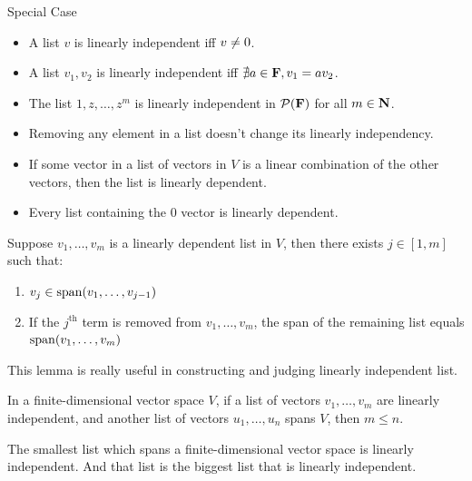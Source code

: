 \documentclass[12pt,a4paper]{article}
\begin{document}
    \begin{eg}
        Special Case
        
        \begin{itemize}
            \item A list $v$ is linearly independent iff $v\not=0$.
            \item A list $v_1,v_2$ is linearly independent iff $\nexists a\in\mathbf{F},v_1=av_2$.
            \item The list $1,z,\dots,z^m$ is linearly independent in $\mathcal{P}(\mathbf{F})$ for all $m\in\mathbf{N}$.
            \item Removing any element in a list doesn't change its linearly independency.\\

            \item If some vector in a list of vectors in $V$ is a linear combination of the other vectors, then the list is linearly dependent.
            \item Every list containing the $0$ vector is linearly dependent.
        \end{itemize}
    \end{eg}
    \hfill
    
    \begin{lemma}\label{2.10}
    Suppose $v_1,\dots,v_m$ is a linearly dependent list in $V$, then there exists $j\in[1,m]$ such that:
    \begin{enumerate}
        \item $v_j\in\operatorname{span}(v_1,\dots,v_{j-1})$
        \item If the $j^\text{th}$ term is removed from $v_1,\dots,v_m$, the span of the remaining list equals $\operatorname{span}(v_1,\dots,v_m)$
    \end{enumerate}
    \end{lemma}
    \begin{remark}
        This lemma is really useful in constructing and judging linearly independent list.
    \end{remark}
    \hfill

    \begin{thm}\label{2.11}
        In a finite-dimensional vector space $V$, if a list of vectors $v_1,\dots,v_m$ are linearly independent, and another list of vectors $u_1,\dots,u_n$ spans $V$, then $m\leq n$.
    \end{thm}
    \begin{remark}
        The smallest list which spans a finite-dimensional vector space is linearly independent. And that list is the biggest list that is linearly independent.
    \end{remark}
    \hfill
\end{document}
